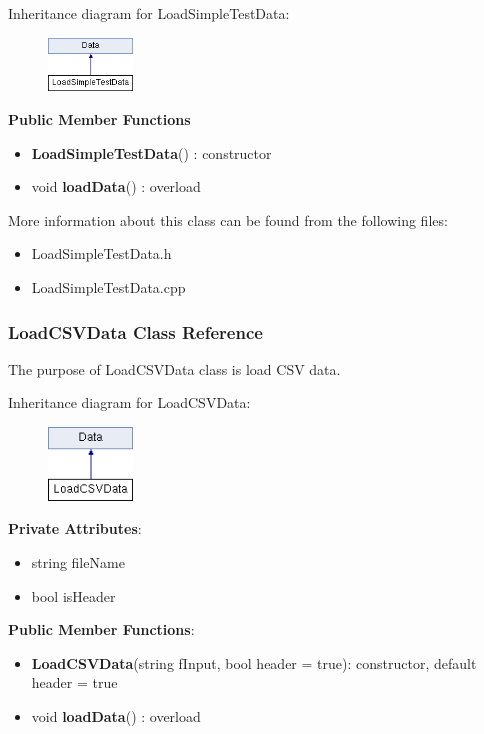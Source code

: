\documentclass{article}
\begin{document}
Inheritance diagram for LoadSimpleTestData:
\begin{figure}[H]
\centering
\includegraphics[width=0.2\textwidth]{class_load_simple_test_data.png}
\end{figure}


\textbf{Public Member Functions}
\begin{itemize}
\item \textbf{LoadSimpleTestData}() : constructor
\item void \textbf{loadData}() : overload
\end{itemize}

More information about this class can be found from the following files:
\begin{itemize}
\item LoadSimpleTestData.h
\item LoadSimpleTestData.cpp
\end{itemize}



\subsubsection{LoadCSVData Class Reference}
The purpose of LoadCSVData class is load CSV data.

Inheritance diagram for LoadCSVData:
\begin{figure}[H]
\centering
\includegraphics[width=0.2\textwidth]{class_load_c_s_v_data.png}
\end{figure}

\textbf{Private Attributes}:
\begin{itemize}
\item string fileName
\item bool isHeader
\end{itemize}

\textbf{Public Member Functions}:
\begin{itemize}
\item \textbf{LoadCSVData}(string fInput, bool header = true): constructor, default header = true
\item void \textbf{loadData}() : overload
\end{itemize}
\end{document}
